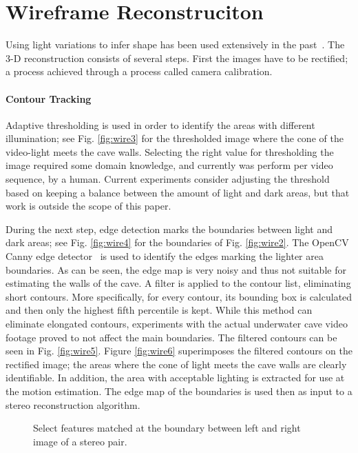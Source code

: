 \section{Wireframe Reconstruciton}\label{sec:pcwireframe}
Using light variations to infer shape has been used extensively in the past~\cite{Kender86shapefrom,Daum1998,Kutulakos2000}. The 3\hyp D reconstruction consists of several steps. First the images have to be rectified; a process achieved through a process called camera calibration. 

\paragraph*{Contour Tracking} Adaptive thresholding is used in order to identify the areas with different illumination; see  Fig. \ref{fig:wire3} for the thresholded image where the cone of the video\hyp light meets the cave walls. Selecting the right value for thresholding the image required some domain knowledge, and currently was perform per video sequence, by a human. Current experiments consider adjusting the threshold based on keeping a balance between the amount of light and dark areas, but that work is outside the scope of this paper.

During the next step, edge detection marks the boundaries between light and dark areas; see Fig. \ref{fig:wire4} for the boundaries of Fig. \ref{fig:wire2}. The OpenCV Canny edge detector~\cite{canny1986computational} is used to identify the edges marking the lighter area boundaries. As can be seen, the edge map is very noisy and thus not suitable for estimating the walls of the cave. A filter is applied to the contour list, eliminating  short contours. More specifically, for every contour, its bounding box is calculated and then only the highest fifth percentile is kept. While this method can eliminate elongated contours, experiments with the actual underwater cave video footage proved to not affect the main boundaries. The filtered contours can be seen in Fig. \ref{fig:wire5}. Figure \ref{fig:wire6} superimposes the filtered contours on the rectified image; the areas where the cone of light meets the cave walls are clearly identifiable. In addition, the area with acceptable lighting is  extracted for use at the motion estimation. The edge map of the boundaries is used then as input to a stereo reconstruction algorithm.

 \begin{figure}[h]
 	\centering
 	\caption{Select features matched at the boundary between left and right image of a stereo pair.}\vspace{-0.2in}
 	\label{fig:Matches}
 \end{figure}

